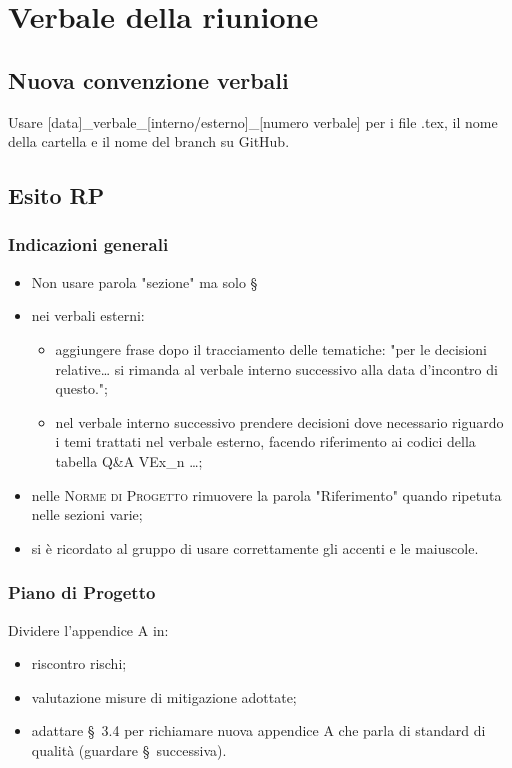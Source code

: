 \section{Verbale della riunione}

\subsection{Nuova convenzione verbali}
Usare [data]\_verbale\_[interno/esterno]\_[numero verbale] per i file .tex, il nome della cartella e il nome del branch su GitHub.

\subsection{Esito RP}

\subsubsection{Indicazioni generali}
\begin{itemize}
	\item Non usare parola "sezione" ma solo \S\;
	\item nei verbali esterni:
	\begin{itemize}
		\item aggiungere frase dopo il tracciamento delle tematiche: "per le decisioni relative… si rimanda al verbale interno successivo alla data d'incontro di questo.";
		\item nel verbale interno successivo prendere decisioni dove necessario riguardo i temi trattati nel verbale esterno, facendo riferimento ai codici della tabella Q\&A VEx\_n …;
	\end{itemize}
	\item nelle \textsc{Norme di Progetto} rimuovere la parola "Riferimento" quando ripetuta nelle sezioni varie;
	\item si è ricordato al gruppo di usare correttamente gli accenti e le maiuscole.
\end{itemize}

\subsubsection{Piano di Progetto}
Dividere l'appendice A in:
\begin{itemize}
	\item riscontro rischi;
	\item valutazione misure di mitigazione adottate;
	\item adattare \S\ 3.4 per richiamare nuova appendice A che parla di standard di qualità (guardare \S\ successiva).
\end{itemize}

